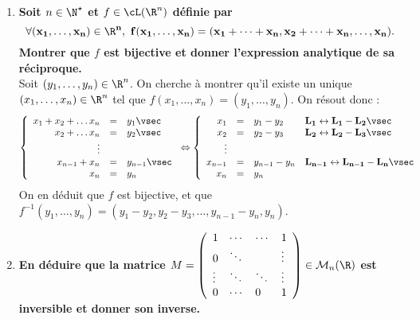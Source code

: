 \documentclass[a4paper, 11pt,reqno]{article}
\begin{document}
\begin{correction}  \;
	\begin{enumerate}
		\item \textbf{Soit $n\in\N^{\star}$ et $f\in\cL(\R^n)$ d\'efinie par}
		      $$\mathbf{\forall (x_1,\dots, x_n)\in\R^n,\ f(x_1,\dots, x_n)=(x_1+\dots+x_n, x_2+\dots+x_n,\dots,x_n).}$$
		      \textbf{Montrer que $f$ est bijective et donner l'expression analytique de sa r\'eciproque.}\\
		      Soit $(y_1,\ldots,y_n)\in \R^n$. On cherche \`a montrer qu'il existe un unique $(x_1,\ldots,x_n) \in \R^n$ tel que $ f(x_1,\dots, x_n)=(y_1,\ldots,y_n)$. On r\'esout donc :\\
		      $$\left\{\begin{array}{rcl}
				      x_1 + x_2 + \ldots x_n & = & y_1\vsec     \\
				      x_2 + \ldots x_n       & = & y_2\vsec     \\
				      \vdots                                    \\
				      x_{n-1}+x_n            & = & y_{n-1}\vsec \\
				      x_n                    & = & y_n
			      \end{array} \right.
			      \Leftrightarrow
			      \left\{\begin{array}{rcll}
				      x_1     & = & y_1-y_2     & \mathbf{L_{1} \leftrightarrow L_{1}-L_2}\vsec     \\
				      x_2     & = & y_2-y_3     & \mathbf{L_{2} \leftrightarrow L_{2}-L_3}\vsec     \\
				      \vdots                                                                        \\
				      x_{n-1} & = & y_{n-1}-y_n & \mathbf{L_{n-1} \leftrightarrow L_{n-1}-L_n}\vsec \\
				      x_n     & = & y_n
			      \end{array} \right.
		      $$
		      On en d\'eduit que $f$ est bijective, et que \textbf{$f^{-1}(y_1, \ldots, y_n) = (y_1-y_2, y_2-y_3, \ldots, y_{n-1}-y_n, y_n)$}.
		\item \textbf{En d\'eduire que la matrice $M=\left(\begin{array}{llll} 1&\cdots&\cdots&1 \\ 0&\ddots& &\vdots \\ \vdots&\ddots&\ddots&\vdots\\ 0&\cdots&0&1        \end{array}\right)\in\mathcal{M}_n(\R)$ est inversible et donner son inverse.}\\

\end{enumerate}
\end{correction}
\end{document}
